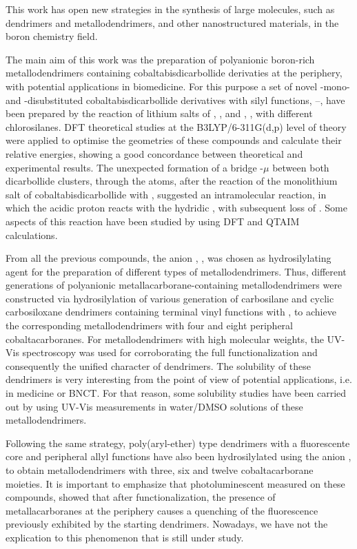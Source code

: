 This work has open new strategies in the synthesis of large molecules, such as dendrimers and metallodendrimers, and other nanostructured materials, in the boron chemistry field. 

The main aim of this work was the preparation of polyanionic boron-rich metallodendrimers containing cobaltabisdicarbollide derivaties at the periphery, with potential applications  in biomedicine. For this purpose a set of novel -mono- and -disubstituted cobaltabisdicarbollide derivatives with silyl functions, \ce{\textbf{[3]}^-}--\ce{\textbf{[10]}^-}, have been prepared by the reaction of lithium salts of \cosane, \ce{\textbf{[1]}^-}, and \cosanep, \ce{\textbf{[2]}^-},  with different chlorosilanes. DFT theoretical studies at the B3LYP/6-311G(d,p) level of theory were applied to optimise the geometries of these compounds and calculate their relative energies, showing a good concordance between theoretical and experimental results. The unexpected formation of a bridge -$\mu$ between both dicarbollide clusters, through the  atoms, after the reaction of the monolithium salt of cobaltabisdicarbollide with , suggested an intramolecular reaction, in which the acidic  proton reacts with the hydridic , with subsequent loss of . Some aspects of this reaction have been studied by using DFT and QTAIM calculations. 

From all the previous compounds, the anion \cosaneSiH, \ce{\textbf{[5]}^-}, was chosen as hydrosilylating agent for the preparation of different types of metallodendrimers. Thus, different generations of polyanionic metallacarborane-containing metallodendrimers were constructed via hydrosilylation of various generation of carbosilane and cyclic carbosiloxane dendrimers containing terminal vinyl functions with \ce{\textbf{[5]}^-}, to achieve the corresponding metallodendrimers with four and eight peripheral cobaltacarboranes. For metallodendrimers with high molecular weights, the UV-Vis spectroscopy was used for corroborating the full functionalization and consequently the unified character of dendrimers. The solubility of these dendrimers is very interesting from the point of view of potential applications, i.e. in medicine or BNCT. For that reason, some solubility studies have been carried out by using UV-Vis measurements in water/DMSO solutions of these metallodendrimers. 

Following the same strategy, poly(aryl-ether) type dendrimers with a fluorescente core and peripheral allyl functions have also been hydrosilylated using the anion \ce{\textbf{[5]}^-}, to obtain metallodendrimers with three, six and twelve cobaltacarborane moieties. It is important to emphasize that photoluminescent measured on these compounds, showed that after functionalization, the presence of metallacarboranes at the periphery causes a quenching of the fluorescence previously exhibited by the starting dendrimers. Nowadays, we have not the explication to this phenomenon that is still under study.

